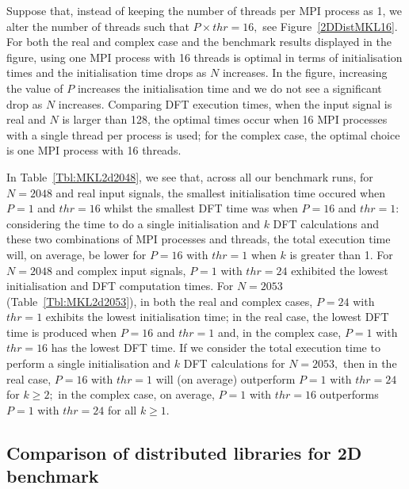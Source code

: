 \documentclass[a4paper]{article}
\begin{document}
Suppose that, instead of keeping the number of threads per MPI process
as 1, we alter the number of threads such that $P\times thr=16,$ see
Figure~\ref{2DDistMKL16}. For both the real and complex case and the
benchmark results displayed in the figure, using one MPI process with
16 threads is optimal in terms of initialisation times and the
initialisation time drops as $N$ increases. In the figure, increasing
the value of $P$ increases the initialisation time and we do not see a
significant drop as $N$ increases.  Comparing DFT execution times,
when the input signal is real and $N$ is larger than 128, the optimal
times occur when 16 MPI processes with a single thread per process is
used; for the complex case, the optimal choice is one MPI process with
16 threads.





In Table~\ref{Tbl:MKL2d2048}, we see that, across all our benchmark
runs, for $N=2048$ and real input signals, the smallest initialisation
time occured when $P=1$ and $thr=16$ whilst the smallest DFT time was
when $P=16$ and $thr=1:$ considering the time to do a single
initialisation and $k$ DFT calculations and these two combinations of
MPI processes and threads, the total execution time will, on average,
be lower for $P=16$ with $thr=1$ when $k$ is greater than 1.
For
$N=2048$ and complex input signals, $P=1$ with $thr=24$ exhibited the
lowest initialisation and DFT computation times. For $N=2053$
(Table~\ref{Tbl:MKL2d2053}), in both the real and complex cases,
$P=24$ with $thr=1$ exhibits the lowest initialisation time; in the
real case, the lowest DFT time is produced when $P=16$ and $thr=1$
and, in the complex case, $P=1$ with $thr=16$ has the lowest DFT
time. If we consider the total execution time to perform a single
initialisation and $k$ DFT calculations for $N=2053,$ then in the real
case, $P=16$ with $thr=1$ will (on average) outperform $P=1$ with
$thr=24$ for $k\ge 2;$ in the complex case, on average, $P=1$ with
$thr=16$ outperforms $P=1$ with $thr=24$ for all $k\ge 1.$









\subsection{Comparison of distributed libraries for 2D benchmark}\label{Sec:2DDistComp}
\end{document}
